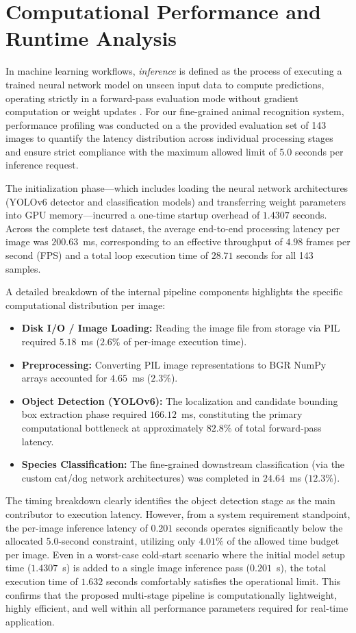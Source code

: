 \section{Computational Performance and Runtime Analysis}
\label{sec:speed}


In machine learning workflows, \textit{inference} is defined as the process of executing a trained neural network model on unseen input data to compute predictions, operating strictly in a forward-pass evaluation mode without gradient computation or weight updates \cite{goodfellow2016deep}. For our fine-grained animal recognition system, performance profiling was conducted on a the provided evaluation set of 143 images to quantify the latency distribution across individual processing stages and ensure strict compliance with the maximum allowed limit of 5.0 seconds per inference request.

The initialization phase—which includes loading the neural network architectures (YOLOv6 detector and classification models) 
and transferring weight parameters into GPU memory—incurred a one-time startup overhead of $1.4307$ seconds. 
Across the complete test dataset, the average end-to-end processing latency per image was $200.63$~ms, corresponding to an effective throughput of $4.98$ frames per second (FPS)
 and a total loop execution time of $28.71$ seconds for all 143 samples.

A detailed breakdown of the internal pipeline components highlights the specific computational distribution per image:
\begin{itemize}
    \item \textbf{Disk I/O / Image Loading:} Reading the image file from storage via PIL required $5.18$~ms ($2.6\%$ of per-image execution time).
    \item \textbf{Preprocessing:} Converting PIL image representations to BGR NumPy arrays accounted for $4.65$~ms ($2.3\%$).
    \item \textbf{Object Detection (YOLOv6):} The localization and candidate bounding box extraction phase required $166.12$~ms, constituting the primary computational bottleneck at approximately $82.8\%$ of total forward-pass latency.
    \item \textbf{Species Classification:} The fine-grained downstream classification (via the custom cat/dog network architectures) was completed in $24.64$~ms ($12.3\%$).
\end{itemize}

The timing breakdown clearly identifies the object detection stage as the main contributor to execution latency. 
However, from a system requirement standpoint, the per-image inference latency of $0.201$ seconds operates significantly below the allocated 5.0-second constraint, 
utilizing only $4.01\%$ of the allowed time budget per image. Even in a worst-case cold-start scenario where the initial model setup time ($1.4307$~s) is added to a 
single image inference pass ($0.201$~s), the total execution time of $1.632$ seconds comfortably satisfies the operational limit. This confirms that the proposed 
multi-stage pipeline is computationally lightweight, highly efficient, and well within all performance parameters required for real-time application.